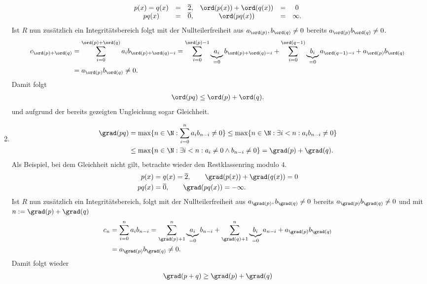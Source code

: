 \begin{solution}
\begin{enumerate}
\begin{align*}
\begin{matrix}
    p(x) = q(x) & = & \overline{2}, & \ord(p(x)) + \ord(q(x)) & = & 0 \\
    pq(x) & = & \overline{0}, & \ord(pq(x)) & = & \infty.
  \end{matrix}
  \end{align*}
  Ist $R$ nun zusätzlich ein Integritätsbereich folgt mit der Nullteilerfreiheit
  aus $a_{\ord(p)}, b_{\ord(q)} \neq 0$ bereits $a_{\ord(p)}b_{\ord(q)} \neq 0$.
  \begin{align*}
    c_{\ord(p) + \ord(q)} &= \sum_{i=0}^{\ord(p) + \ord(q)}a_ib_{\ord(p) + \ord(q)-i} =
    \sum_{i=0}^{\ord(p) -1}\underbrace{a_i}_{=0}b_{\ord(p) + \ord(q)-i} +
    \sum_{i = 0}^{\ord(q - 1)}\underbrace{b_i}_{=0}a_{\ord(q-1) - i}
    + a_{\ord(p)}b_{\ord(q)} \\
    &= a_{\ord(p)}b_{\ord(q)} \neq 0.
  \end{align*}
  Damit folgt
  \begin{align*}
    \ord(pq) \leq \ord(p) + \ord(q).
  \end{align*}
  und aufgrund der bereits gezeigten Ungleichung sogar Gleichheit.
  \item \begin{align*}
    \grad(pq) &= \max\{n \in \N: \sum_{i=0}^{n}a_ib_{n-i} \neq 0\}
    \leq \max\{n \in \N: \exists i < n: a_ib_{n-i} \neq 0\} \\
    &\leq \max\{n \in \N: \exists i < n: a_i \neq 0 \land b_{n-i} \neq 0\}
    = \grad(p) + \grad(q).
  \end{align*}
  Als Beispiel, bei dem Gleichheit nicht gilt, betrachte wieder den Restklassenring modulo $4$.
  \begin{align*}
  p(x) &= q(x) = \overline{2}, \qquad \grad(p(x)) + \grad(q(x)) = 0 \\
  pq(x) &= \overline{0}, \qquad \grad(pq(x)) = -\infty.
  \end{align*}
  Ist $R$ nun zusätzlich ein Integritätsbereich, folgt mit der Nullteilerfreiheit
  aus $a_{\grad(p)}, b_{\grad(q)} \neq 0$ bereits $a_{\grad(p)}b_{\grad(q)} \neq 0$
  und mit $n := \grad(p) + \grad(q)$
  \begin{align*}
  c_n &= \sum_{i=0}^{n}a_ib_{n-i} =
  \sum_{\grad(p) + 1}^{n}\underbrace{a_i}_{=0}b_{n - i} +
  \sum_{\grad(q) + 1}^{n}\underbrace{b_i}_{=0}a_{n - i}
  + a_{\grad(p)}b_{\grad(q)} \\
  &= a_{\grad(p)}b_{\grad(q)} \neq 0.
  \end{align*}
  Damit folgt wieder
  \begin{align*}
    \grad(p + q) \geq \grad(p) + \grad(q)

\end{align*}
\end{enumerate}
\end{solution}
